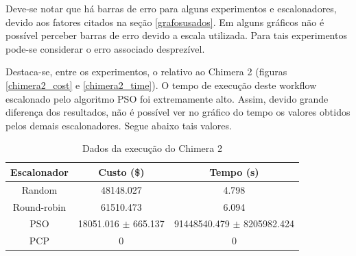 \documentclass[a4paper,10pt]{article}
\begin{document}
Deve-se notar que há barras de erro para alguns experimentos e escalonadores,
devido aos fatores citados na seção \ref{grafosusados}. Em alguns gráficos não
é possível perceber barras de erro devido a escala utilizada. Para tais experimentos
pode-se considerar o erro associado desprezível.

Destaca-se, entre os experimentos, o relativo ao Chimera 2 (figuras \ref{chimera2_cost} e 
\ref{chimera2_time}). O tempo de execução deste workflow escalonado pelo algoritmo PSO
foi extremamente alto. Assim, devido grande diferença dos
resultados, não é possível ver no gráfico do tempo os valores obtidos pelos demais escalonadores.
Segue abaixo tais valores.

\begin{table}
\centering

  \begin{tabular}{|c|c|c|}  
    \hline
    \textbf{Escalonador} & \textbf{Custo} (\$) & \textbf{Tempo (s)} \\
    \hline
    Random & 48148.027 & 4.798 \\
    \hline
    Round-robin & 61510.473 & 6.094 \\
    \hline
    PSO & 18051.016 $\pm$ 665.137 & 91448540.479 $\pm$ 8205982.424 \\
    \hline
    PCP & 0 & 0 \\
    \hline

  \end{tabular}
  \caption{Dados da execução do Chimera 2}
  \label{tab:dados_chimera2}
\end{table}
\end{document}
